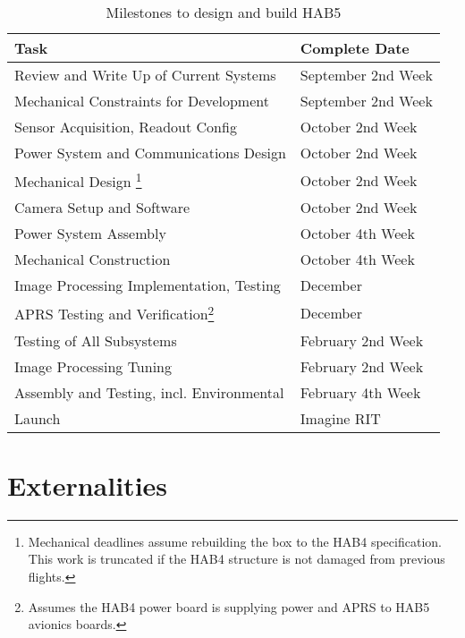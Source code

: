 \documentclass[conference]{IEEEtran} %
\begin{document}
\begin{table}[!ht]
  \centering
  \caption{Milestones to design and build HAB5}

\begin{minipage}{.45\textwidth}
  \noindent
  \begin{tabular}{@{}ll@{}}

  \label{milestones-table}
    \textbf{Task} & \textbf{Complete Date} \\
    \midrule
    Review and Write Up of Current Systems & September 2nd Week \\
    Mechanical Constraints for Development & September 2nd Week \\ 
    Sensor Acquisition, Readout Config & October 2nd Week \\
    Power System and Communications Design & October 2nd Week \\
    Mechanical Design \footnote{Mechanical deadlines assume rebuilding the box to the HAB4 specification. This work is truncated if the HAB4 structure is not damaged from previous flights.} & October 2nd Week \\
    Camera Setup and Software & October 2nd Week \\
    Power System Assembly & October 4th Week \\
    Mechanical Construction & October 4th Week \\
    Image Processing Implementation, Testing & December \\
    APRS Testing and Verification\footnote{Assumes the HAB4 power board is supplying power and APRS to HAB5 avionics boards.} & December \\
    Testing of All Subsystems & February 2nd Week \\
    Image Processing Tuning & February 2nd Week \\
    Assembly and Testing, incl. Environmental & February 4th Week \\
    Launch & Imagine RIT \\
  \end{tabular}
\end{minipage}
\end{table}

\section{Externalities}
\end{document}
